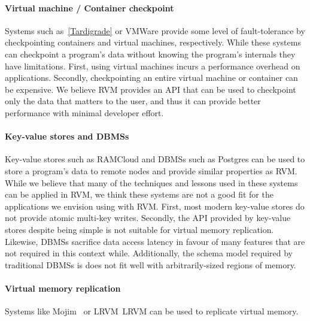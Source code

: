 \paragraph {\bf Virtual machine / Container checkpoint}
Systems such as~\ref{Tardigrade} or VMWare provide some level of fault-tolerance by checkpointing containers and virtual machines, respectively.
While these systems can checkpoint a program's data without knowing the program's internals they have limitations. 
First, using virtual machines incurs a performance overhead on applications. Secondly, checkpointing an entire virtual machine or container can be expensive.
We believe RVM provides an API that can be used to checkpoint only the data that matters to the user, and thus it can provide better performance with minimal developer effort.

\paragraph {\bf Key-value stores and DBMSs}
Key-value stores such as RAMCloud and DBMSs such as Postgres can be used to store a program's data to remote nodes and provide similar
properties as RVM. While we believe that many of the techniques and lessons used in these systems can be applied in RVM, we think these 
systems are not a good fit for the applications we envision using with RVM.
First, most modern key-value stores do not provide atomic multi-key writes.
Secondly, the API provided by key-value stores despite being simple is not suitable for virtual memory replication.
Likewise, DBMSs sacrifice data access latency in favour of many features that are not required in this context while. Additionally, the schema model required by traditional DBMSs is
does not fit well with arbitrarily-sized regions of memory.


\paragraph {\bf Virtual memory replication}
Systems like Mojim~\cite{Mojim} or LRVM~{LRVM} can be used to replicate virtual memory.
